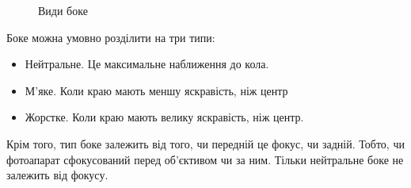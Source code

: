 \documentclass{diploma}
\begin{document}
      \begin{figure}[h]
        \hfill
        \hfill
        \caption{Види боке}
        \label{fig:boke}
      \end{figure}

      Боке можна умовно розділити на три типи:
      \begin{itemize}
        \item Нейтральне. Це максимальне наближення до кола.
        \item М’яке. Коли краю мають меншу яскравість, ніж центр
        \item Жорстке. Коли краю мають велику яскравість, ніж центр.
      \end{itemize}
      Крім того, тип боке залежить від того, чи передній це фокус, чи
      задній.
      Тобто, чи фотоапарат сфокусований перед об’єктивом чи за ним.
      Тільки нейтральне боке не залежить від фокусу.
\end{document}
